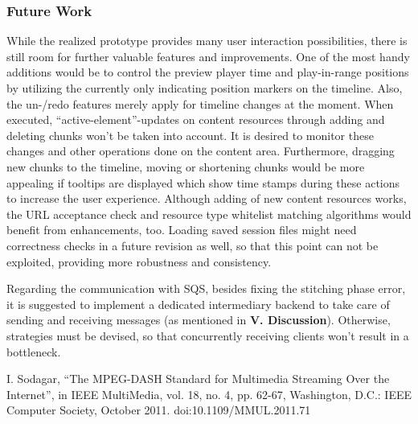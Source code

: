 \documentclass[conference]{IEEEtran}
\begin{document}
\subsubsection*{Future Work}
While the realized prototype provides many user interaction possibilities, there is still room for further valuable features and improvements.
One of the most handy additions would be to control the preview player time and play-in-range positions by utilizing the currently only indicating position markers on the timeline.
Also, the un-/redo features merely apply for timeline changes at the moment.
When executed, ``active-element''-updates on content resources through adding and deleting chunks won't be taken into account.
It is desired to monitor these changes and other operations done on the content area.
Furthermore, dragging new chunks to the timeline, moving or shortening chunks would be more appealing if tooltips are displayed which show time stamps during these actions to increase the user experience.
Although adding of new content resources works, the URL acceptance check and resource type whitelist matching algorithms would benefit from enhancements, too.
Loading saved session files might need correctness checks in a future revision as well, so that this point can not be exploited, providing more robustness and consistency.

Regarding the communication with SQS, besides fixing the stitching phase error, it is suggested to implement a dedicated intermediary backend to take care of sending and receiving messages (as mentioned in \textbf{V. Discussion}).
Otherwise, strategies must be devised, so that concurrently receiving clients won't result in a bottleneck.

\begin{thebibliography}{00}
 I. Sodagar, ``The MPEG-DASH Standard for Multimedia Streaming Over the Internet'', in IEEE MultiMedia, vol. 18, no. 4, pp. 62-67, Washington, D.C.: IEEE Computer Society, October 2011. doi:10.1109/MMUL.2011.71
\end{thebibliography}
\end{document}
